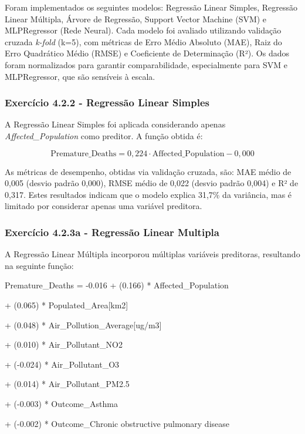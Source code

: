 \documentclass[conference]{IEEEtran}
\begin{document}
Foram implementados os seguintes modelos: Regressão Linear Simples, Regressão Linear Múltipla, Árvore de Regressão, Support Vector Machine (SVM) e MLPRegressor (Rede Neural). Cada modelo foi avaliado utilizando validação cruzada \textit{k-fold} (k=5), com métricas de Erro Médio Absoluto (MAE), Raiz do Erro Quadrático Médio (RMSE) e Coeficiente de Determinação (R²). Os dados foram normalizados para garantir comparabilidade, especialmente para SVM e MLPRegressor, que são sensíveis à escala.

\medskip
\subsubsection{\textbf{Exercício 4.2.2 - Regressão Linear Simples}}

A Regressão Linear Simples foi aplicada considerando apenas \textit{Affected\_Population} como preditor. A função obtida é:

\begin{equation}
	\text{Premature\_Deaths} = 0{,}224 \cdot \text{Affected\_Population} - 0{,}000
\end{equation}

As métricas de desempenho, obtidas via validação cruzada, são: MAE médio de 0,005 (desvio padrão 0,000), RMSE médio de 0,022 (desvio padrão 0,004) e R² de 0,317. Estes resultados indicam que o modelo explica 31,7\% da variância, mas é limitado por considerar apenas uma variável preditora.

\medskip
\subsubsection{\textbf{Exercício 4.2.3a - Regressão Linear Multipla}}

A Regressão Linear Múltipla incorporou múltiplas variáveis preditoras, resultando na seguinte função:

Premature\_Deaths = -0.016 + (0.166) * Affected\_Population 

+ (0.065) * Populated\_Area[km2] 

+ (0.048) * Air\_Pollution\_Average[ug/m3] 

+ (0.010) * Air\_Pollutant\_NO2 

+ (-0.024) * Air\_Pollutant\_O3 

+ (0.014) * Air\_Pollutant\_PM2.5 

+ (-0.003) * Outcome\_Asthma 

+ (-0.002) * Outcome\_Chronic obstructive pulmonary disease 
\end{document}
